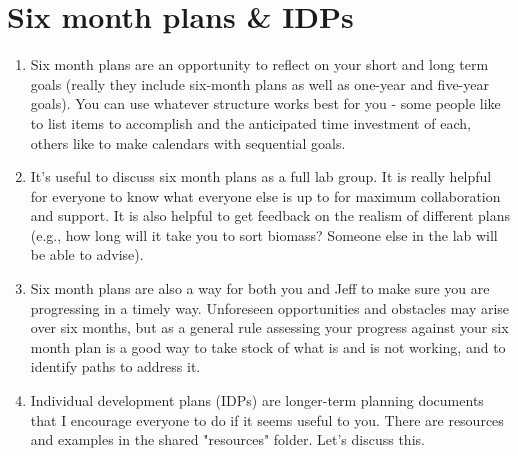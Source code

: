 \documentclass[12pt]{article}
\begin{document}
\section{Six month plans & IDPs}
\begin{enumerate}
\item Six month plans are an opportunity to reflect on your short and long term goals (really they include six-month plans as well as one-year and five-year goals). You can use whatever structure works best for you - some people like to list items to accomplish and the anticipated time investment of each, others like to make calendars with sequential goals. 
\item It's useful to discuss six month plans as a full lab group. It is really helpful for everyone to know what everyone else is up to for maximum collaboration and support. It is also helpful to get feedback on the realism of different plans (e.g., how long will it take you to sort biomass? Someone else in the lab will be able to advise). 
\item Six month plans are also a way for both you and Jeff to make sure you are progressing in a timely way. Unforeseen opportunities and obstacles may arise over six months, but as a general rule assessing your progress against your six month plan is a good way to take stock of what is and is not working, and to identify paths to address it.
\item Individual development plans (IDPs) are longer-term planning documents that I encourage everyone to do if it seems useful to you.  There are resources and examples in the shared "resources" folder. Let's discuss this.
\end{enumerate}
\end{document}
